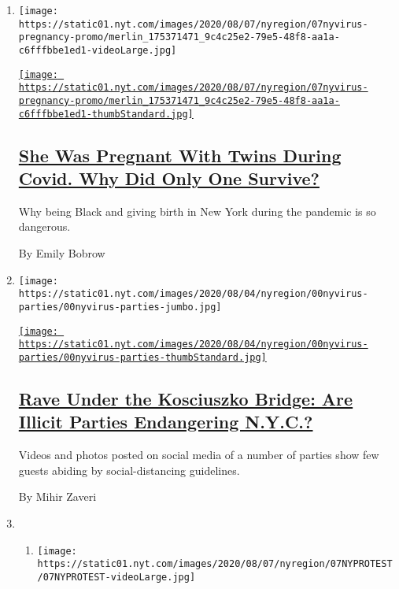 \begin{enumerate}
\def\labelenumi{\arabic{enumi}.}
\item
  \texttt{[image: https://static01.nyt.com/images/2020/08/07/nyregion/07nyvirus-pregnancy-promo/merlin\_175371471\_9c4c25e2-79e5-48f8-aa1a-c6fffbbe1ed1-videoLarge.jpg]}

  \href{/2020/08/06/nyregion/childbirth-Covid-Black-mothers.html}{\texttt{[image: https://static01.nyt.com/images/2020/08/07/nyregion/07nyvirus-pregnancy-promo/merlin\_175371471\_9c4c25e2-79e5-48f8-aa1a-c6fffbbe1ed1-thumbStandard.jpg]}}

  \hypertarget{she-was-pregnant-with-twins-during-covid-why-did-only-one-survive}{%
  \subsection{\texorpdfstring{\href{/2020/08/06/nyregion/childbirth-Covid-Black-mothers.html}{She
  Was Pregnant With Twins During Covid. Why Did Only One
  Survive?}}{She Was Pregnant With Twins During Covid. Why Did Only One Survive?}}\label{she-was-pregnant-with-twins-during-covid-why-did-only-one-survive}}

  Why being Black and giving birth in New York during the pandemic is so
  dangerous.

  By Emily Bobrow
\item
  \texttt{[image: https://static01.nyt.com/images/2020/08/04/nyregion/00nyvirus-parties/00nyvirus-parties-jumbo.jpg]}

  \href{/2020/08/08/nyregion/nyc-illegal-parties.html}{\texttt{[image: https://static01.nyt.com/images/2020/08/04/nyregion/00nyvirus-parties/00nyvirus-parties-thumbStandard.jpg]}}

  \hypertarget{rave-under-the-kosciuszko-bridge-are-illicit-parties-endangering-nyc}{%
  \subsection{\texorpdfstring{\href{/2020/08/08/nyregion/nyc-illegal-parties.html}{Rave
  Under the Kosciuszko Bridge: Are Illicit Parties Endangering
  N.Y.C.?}}{Rave Under the Kosciuszko Bridge: Are Illicit Parties Endangering N.Y.C.?}}\label{rave-under-the-kosciuszko-bridge-are-illicit-parties-endangering-nyc}}

  Videos and photos posted on social media of a number of parties show
  few guests abiding by social-distancing guidelines.

  By Mihir Zaveri
\item
  \begin{enumerate}
  \def\labelenumii{\arabic{enumii}.}
  \item
    \texttt{[image: https://static01.nyt.com/images/2020/08/07/nyregion/07NYPROTEST/07NYPROTEST-videoLarge.jpg]}


\end{enumerate}
\end{enumerate}
